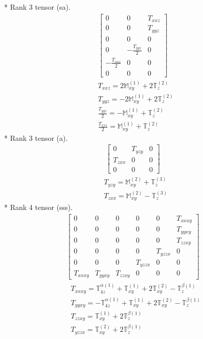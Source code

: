 \documentclass[fleqn,8pt,landscape]{jsarticle}
\begin{document}
* Rank 3 tensor (sa).
\begin{align*}
\begin{bmatrix} 0 & 0 & T_{xxz} \\ 0 & 0 & T_{yyz} \\ 0 & 0 & 0 \\ 0 & - \frac{T_{yyz}}{2} & 0 \\ - \frac{T_{xxz}}{2} & 0 & 0 \\ 0 & 0 & 0 \end{bmatrix}
\end{align*}
\begin{align*}
& T_{xxz} = 2 \mathbb{M}_{xy}^{(1)} + 2 \mathbb{T}_{z}^{(2)} \\
& T_{yyz} = - 2 \mathbb{M}_{xy}^{(1)} + 2 \mathbb{T}_{z}^{(2)} \\
& \frac{T_{yyz}}{2} = - \mathbb{M}_{xy}^{(1)} + \mathbb{T}_{z}^{(2)} \\
& \frac{T_{xxz}}{2} = \mathbb{M}_{xy}^{(1)} + \mathbb{T}_{z}^{(2)}
\end{align*}
* Rank 3 tensor (a).
\begin{align*}
\begin{bmatrix} 0 & T_{yzy} & 0 \\ T_{zxx} & 0 & 0 \\ 0 & 0 & 0 \end{bmatrix}
\end{align*}
\begin{align*}
& T_{yzy} = \mathbb{M}_{xy}^{(2)} + \mathbb{T}_{z}^{(3)} \\
& T_{zxx} = \mathbb{M}_{xy}^{(2)} - \mathbb{T}_{z}^{(3)}
\end{align*}
* Rank 4 tensor (sss).
\begin{align*}
\begin{bmatrix} 0 & 0 & 0 & 0 & 0 & T_{xxxy} \\ 0 & 0 & 0 & 0 & 0 & T_{yyxy} \\ 0 & 0 & 0 & 0 & 0 & T_{zzxy} \\ 0 & 0 & 0 & 0 & T_{yzzx} & 0 \\ 0 & 0 & 0 & T_{yzzx} & 0 & 0 \\ T_{xxxy} & T_{yyxy} & T_{zzxy} & 0 & 0 & 0 \end{bmatrix}
\end{align*}
\begin{align*}
& T_{xxxy} = \mathbb{T}_{4z}^{\alpha(1)} + \mathbb{T}_{xy}^{(1)} + 2 \mathbb{T}_{xy}^{(2)} - \mathbb{T}_{z}^{\beta(1)} \\
& T_{yyxy} = - \mathbb{T}_{4z}^{\alpha(1)} + \mathbb{T}_{xy}^{(1)} + 2 \mathbb{T}_{xy}^{(2)} - \mathbb{T}_{z}^{\beta(1)} \\
& T_{zzxy} = \mathbb{T}_{xy}^{(1)} + 2 \mathbb{T}_{z}^{\beta(1)} \\
& T_{yzzx} = \mathbb{T}_{xy}^{(2)} + 2 \mathbb{T}_{z}^{\beta(1)}
\end{align*}
\end{document}
